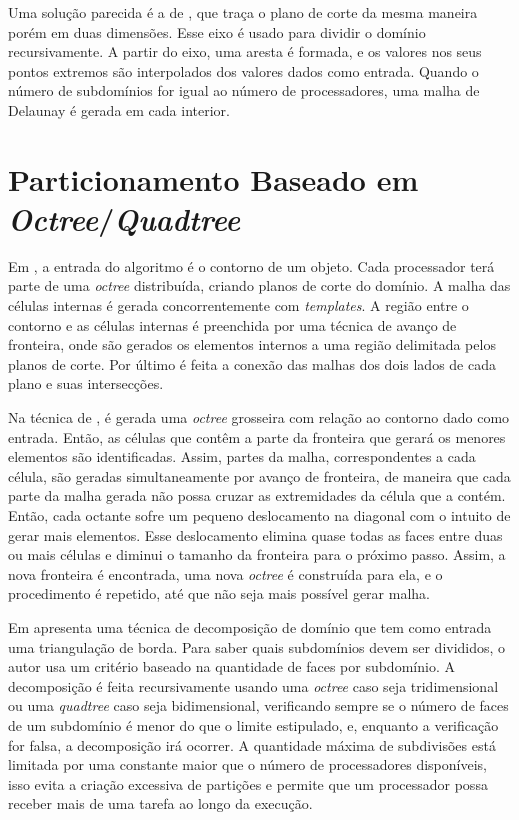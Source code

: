 Uma solução parecida é a de \cite{bib:Lammer00}, que traça o plano de corte da mesma maneira porém em duas dimensões. Esse eixo é usado para dividir o domínio recursivamente. A partir do eixo, uma aresta é formada, e os valores nos seus pontos extremos são interpolados dos valores dados como entrada. Quando o número de subdomínios for igual ao número de processadores, uma malha de Delaunay é gerada em cada interior.

\section{Particionamento Baseado em \textit{Octree}/\textit{Quadtree}}

Em \cite{bib:deCougny99}, a entrada do algoritmo é o contorno de um objeto. Cada processador terá parte de uma \textit{octree} distribuída, criando planos de corte do domínio. A malha das células internas é gerada concorrentemente com \textit{templates}. A região entre o contorno e as células internas é preenchida por uma técnica de avanço de fronteira, onde são gerados os elementos internos a uma região delimitada pelos planos de corte. Por último é feita a conexão das malhas dos dois lados de cada plano e suas intersecções.

Na técnica de \cite{bib:Lohner01}, é gerada uma \textit{octree} grosseira com relação ao contorno dado como entrada. Então, as células que contêm a parte da fronteira que gerará os menores elementos são identificadas. Assim, partes da malha, correspondentes a cada célula, são geradas simultaneamente por avanço de fronteira, de maneira que cada parte da malha gerada não possa cruzar as extremidades da célula que a contém. Então, cada octante sofre um pequeno deslocamento na diagonal com o intuito de gerar mais elementos. Esse deslocamento elimina quase todas as faces entre duas ou mais células e diminui o tamanho da fronteira para o próximo passo. Assim, a nova fronteira é encontrada, uma nova \textit{octree} é construída para ela, e o procedimento é repetido, até que não seja mais possível gerar malha.

Em \cite{bib:Larwood03} apresenta uma técnica de decomposição de domínio que tem como entrada uma triangulação de borda. Para saber quais subdomínios devem ser divididos, o autor usa um critério baseado na quantidade de faces por subdomínio. A decomposição é feita recursivamente usando uma \textit{octree} caso seja tridimensional ou uma \textit{quadtree} caso seja bidimensional, verificando sempre se o número de faces de um subdomínio é menor do que o limite estipulado, e, enquanto a verificação for falsa, a decomposição irá ocorrer. A quantidade máxima de subdivisões está limitada por uma constante maior que o número de processadores disponíveis, isso evita a criação excessiva de partições e permite que um processador possa receber mais de uma tarefa ao longo da execução.


